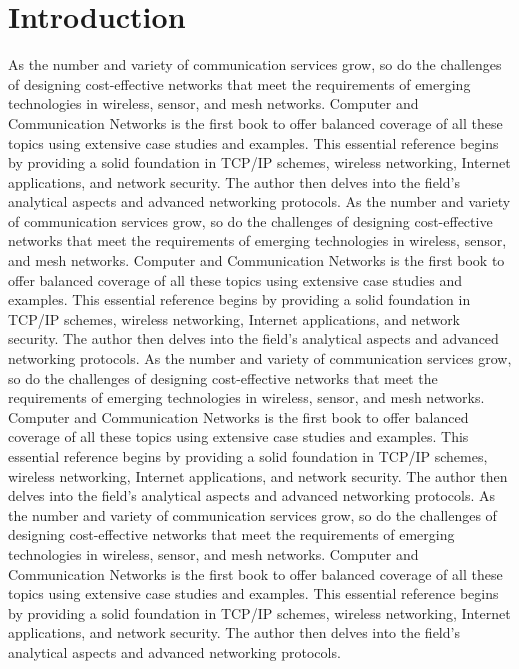 \section{Introduction}
As the number and variety of communication services grow, so do the challenges of designing cost-effective networks that meet the requirements of emerging technologies in wireless, sensor, and mesh networks. Computer and Communication Networks is the first book to offer balanced coverage of all these topics using extensive case studies and examples.
This essential reference begins by providing a solid foundation in TCP/IP schemes, wireless networking, Internet applications, and network security. The author then delves into the field's analytical aspects and advanced networking protocols.
\newline
As the number and variety of communication services grow, so do the challenges of designing cost-effective networks that meet the requirements of emerging technologies in wireless, sensor, and mesh networks. Computer and Communication Networks is the first book to offer balanced coverage of all these topics using extensive case studies and examples.
This\cite{yared, demeke} essential reference begins by providing a solid foundation in TCP/IP schemes, wireless networking, Internet applications, and network security. The author then delves into the field's analytical aspects and advanced networking protocols.
\newpage
As the number and variety of communication services grow, so do the challenges of designing cost-effective networks that meet the requirements of emerging technologies in wireless, sensor, and mesh networks. Computer and Communication Networks is the first book to offer balanced coverage of all these topics using extensive case studies and examples\cite{demeke}.
This essential reference begins by providing a solid foundation in TCP/IP schemes, wireless networking, Internet applications, and network security. The author then delves into the field's analytical aspects and advanced networking protocols.
As the number and variety of communication services grow, so do the challenges of designing cost-effective networks that meet the requirements of emerging technologies in wireless, sensor, and mesh networks. Computer and Communication Networks is the first book to offer balanced coverage of all these topics using extensive case studies and examples.
This essential reference begins by providing a solid foundation in TCP/IP schemes, wireless networking, Internet applications, and network security. The author then delves into the field's analytical aspects and advanced networking protocols.

